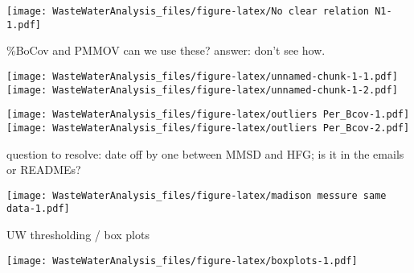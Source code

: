\documentclass[
]{article}
\begin{document}
\texttt{[image: WasteWaterAnalysis\_files/figure-latex/No clear relation N1-1.pdf]}

\%BoCov and PMMOV can we use these? answer: don't see how.

\texttt{[image: WasteWaterAnalysis\_files/figure-latex/unnamed-chunk-1-1.pdf]}
\texttt{[image: WasteWaterAnalysis\_files/figure-latex/unnamed-chunk-1-2.pdf]}

\texttt{[image: WasteWaterAnalysis\_files/figure-latex/outliers Per\_Bcov-1.pdf]}
\texttt{[image: WasteWaterAnalysis\_files/figure-latex/outliers Per\_Bcov-2.pdf]}

question to resolve: date off by one between MMSD and HFG; is it in the
emails or READMEs?

\texttt{[image: WasteWaterAnalysis\_files/figure-latex/madison messure same data-1.pdf]}

UW thresholding / box plots

\texttt{[image: WasteWaterAnalysis\_files/figure-latex/boxplots-1.pdf]}
\end{document}

